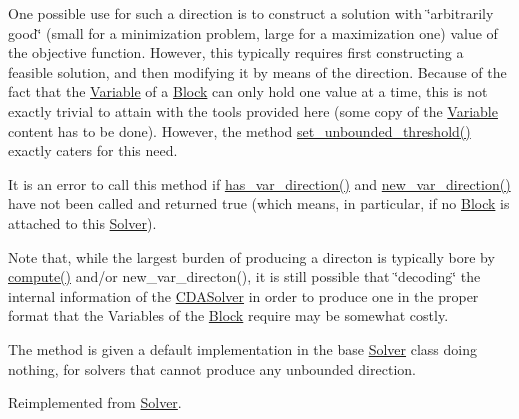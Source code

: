 One possible use for such a direction is to construct a solution with \char`\"{}arbitrarily good\char`\"{} (small for a minimization problem, large for a maximization one) value of the objective function. However, this typically requires first constructing a feasible solution, and then modifying it by means of the direction. Because of the fact that the \mbox{\hyperlink{class_s_m_spp__di__unipi__it_1_1_variable}{Variable}} of a \mbox{\hyperlink{class_s_m_spp__di__unipi__it_1_1_block}{Block}} can only hold one value at a time, this is not exactly trivial to attain with the tools provided here (some copy of the \mbox{\hyperlink{class_s_m_spp__di__unipi__it_1_1_variable}{Variable}} content has to be done). However, the method \mbox{\hyperlink{class_s_m_spp__di__unipi__it_1_1_solver_ae1717d1363782e086aa797e7437c0352}{set\+\_\+unbounded\+\_\+threshold()}} exactly caters for this need.

It is an error to call this method if \mbox{\hyperlink{class_s_m_spp__di__unipi__it_1_1_m_c_f_solver_a4f0fecd26f7731710ff6af22fa0cc635}{has\+\_\+var\+\_\+direction()}} and \mbox{\hyperlink{class_s_m_spp__di__unipi__it_1_1_solver_a673fc1c81a1fc86e55dfab3a37f303bc}{new\+\_\+var\+\_\+direction()}} have not been called and returned true (which means, in particular, if no \mbox{\hyperlink{class_s_m_spp__di__unipi__it_1_1_block}{Block}} is attached to this \mbox{\hyperlink{class_s_m_spp__di__unipi__it_1_1_solver}{Solver}}).

Note that, while the largest burden of producing a directon is typically bore by \mbox{\hyperlink{class_s_m_spp__di__unipi__it_1_1_m_c_f_solver_afc8ff54ab05d22f4cca0fb0bfbeb7a49}{compute()}} and/or new\+\_\+var\+\_\+directon(), it is still possible that \char`\"{}decoding\char`\"{} the internal information of the \mbox{\hyperlink{class_s_m_spp__di__unipi__it_1_1_c_d_a_solver}{C\+D\+A\+Solver}} in order to produce one in the proper format that the Variables of the \mbox{\hyperlink{class_s_m_spp__di__unipi__it_1_1_block}{Block}} require may be somewhat costly.

The method is given a default implementation in the base \mbox{\hyperlink{class_s_m_spp__di__unipi__it_1_1_solver}{Solver}} class doing nothing, for solvers that cannot produce any unbounded direction. 

Reimplemented from \mbox{\hyperlink{class_s_m_spp__di__unipi__it_1_1_solver_a4bc119810c0c2ee3ba0c48183f50aaf4}{Solver}}.

\mbox{\label{class_s_m_spp__di__unipi__it_1_1_m_c_f_solver_ac83fa9679882440d13fb5940494699c5}} 

